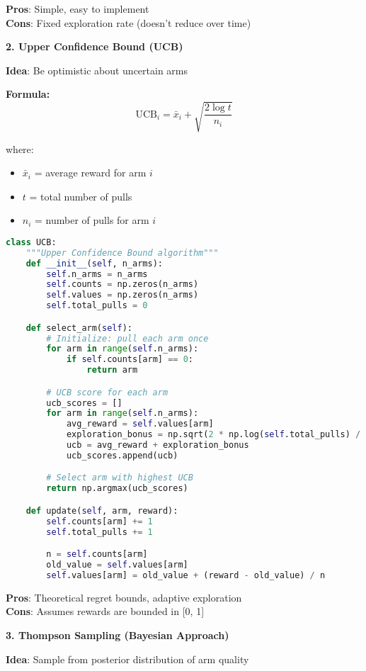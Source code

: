 \documentclass[10pt]{article}
\begin{document}
\textbf{Pros}: Simple, easy to implement \\
\textbf{Cons}: Fixed exploration rate (doesn't reduce over time)

\textbf{2. Upper Confidence Bound (UCB)}

\textbf{Idea}: Be optimistic about uncertain arms

\textbf{Formula:}
$$\text{UCB}_i = \bar{x}_i + \sqrt{\frac{2 \log t}{n_i}}$$

where:
\begin{itemize}
\item $\bar{x}_i$ = average reward for arm $i$
\item $t$ = total number of pulls
\item $n_i$ = number of pulls for arm $i$
\end{itemize}

\begin{lstlisting}[language=Python]
class UCB:
    """Upper Confidence Bound algorithm"""
    def __init__(self, n_arms):
        self.n_arms = n_arms
        self.counts = np.zeros(n_arms)
        self.values = np.zeros(n_arms)
        self.total_pulls = 0

    def select_arm(self):
        # Initialize: pull each arm once
        for arm in range(self.n_arms):
            if self.counts[arm] == 0:
                return arm

        # UCB score for each arm
        ucb_scores = []
        for arm in range(self.n_arms):
            avg_reward = self.values[arm]
            exploration_bonus = np.sqrt(2 * np.log(self.total_pulls) / self.counts[arm])
            ucb = avg_reward + exploration_bonus
            ucb_scores.append(ucb)

        # Select arm with highest UCB
        return np.argmax(ucb_scores)

    def update(self, arm, reward):
        self.counts[arm] += 1
        self.total_pulls += 1

        n = self.counts[arm]
        old_value = self.values[arm]
        self.values[arm] = old_value + (reward - old_value) / n
\end{lstlisting}

\textbf{Pros}: Theoretical regret bounds, adaptive exploration \\
\textbf{Cons}: Assumes rewards are bounded in [0, 1]

\textbf{3. Thompson Sampling (Bayesian Approach)}

\textbf{Idea}: Sample from posterior distribution of arm quality
\end{document}
